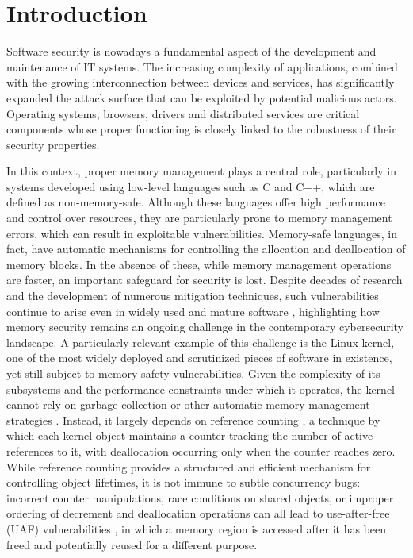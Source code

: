 \chapter{Introduction}

Software security is nowadays a fundamental aspect of the development and maintenance of IT systems. The increasing complexity of applications, combined with the growing interconnection between devices and services, has significantly expanded the attack surface that can be exploited by potential malicious actors. Operating systems, browsers, drivers and distributed services are critical components whose proper functioning is closely linked to the robustness of their security properties.

In this context, proper memory management plays a central role, particularly in systems developed using low-level languages such as C and C++, which are defined as non-memory-safe. Although these languages offer high performance and control over resources, they are particularly prone to memory management errors, which can result in exploitable vulnerabilities. Memory-safe languages, in fact, have automatic mechanisms for controlling the allocation and deallocation of memory blocks. In the absence of these, while memory management operations are faster, an important safeguard for security is lost. Despite decades of research and the development of numerous mitigation techniques, such vulnerabilities continue to arise even in widely used and mature software \cite{bib:google-memory-safety, bib:memory-errors-survey, bib:microsoft-memory-safety}, highlighting how memory security remains an ongoing challenge in the contemporary cybersecurity landscape. A particularly relevant example of this challenge is the Linux kernel, one of the most widely deployed and scrutinized pieces of software in existence, yet still subject to memory safety vulnerabilities. Given the complexity of its subsystems and the performance constraints under which it operates, the kernel cannot rely on garbage collection or other automatic memory management strategies \cite{bib:linux-kernel-refcounting}. Instead, it largely depends on reference counting \cite{bib:linux-kernel-kref}, a technique by which each kernel object maintains a counter tracking the number of active references to it, with deallocation occurring only when the counter reaches zero. While reference counting provides a structured and efficient mechanism for controlling object lifetimes, it is not immune to subtle concurrency bugs: incorrect counter manipulations, race conditions on shared objects, or improper ordering of decrement and deallocation operations can all lead to use-after-free (UAF) vulnerabilities \cite{bib:use-after-free}, in which a memory region is accessed after it has been freed and potentially reused for a different purpose.

